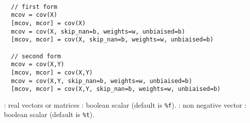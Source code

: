 
\begin{mandesc}
   \\
\end{mandesc}

\begin{calling_sequence}
\begin{verbatim}
  // first form
  mcov = cov(X)
  [mcov, mcor] = cov(X)
  mcov = cov(X, skip_nan=b, weights=w, unbiaised=b)
  [mcov, mcor] = cov(X, skip_nan=b, weights=w, unbiaised=b)

  // second form
  mcov = cov(X,Y)
  [mcov, mcor] = cov(X,Y)
  mcov = cov(X,Y, skip_nan=b, weights=w, unbiaised=b)
  [mcov, mcor] = cov(X,Y, skip_nan=b, weights=w, unbiaised=b)
\end{verbatim}
\end{calling_sequence}
\begin{parameters}
  \begin{varlist}
    : real vectors or matrices
    : boolean scalar (default is \verb+%f+).
    : non negative vector
    :  boolean scalar (default is \verb+%t+).
  \end{varlist}
\end{parameters}

